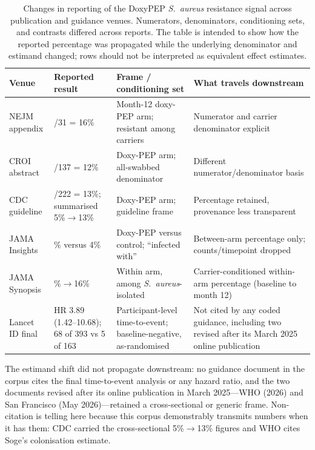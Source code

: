 \documentclass[12pt,a4paper]{article}
\newcommand{\sa}{\emph{S.~aureus}}
\begin{document}
\begin{table}[t]
\centering
\caption{Changes in reporting of the DoxyPEP \sa{} resistance signal across publication and guidance venues.
Numerators, denominators, conditioning sets, and contrasts differed across reports. The table is intended to show how the reported percentage was propagated while the underlying denominator and estimand changed; rows should not be interpreted as equivalent effect estimates.}
\label{tab:propagation}
\footnotesize
\setlength{\tabcolsep}{4pt}
\renewcommand{\arraystretch}{1.15}
\begin{tabularx}{\textwidth}{@{}
  >{\raggedright\arraybackslash}p{}
  >{\raggedright\arraybackslash}p{}
  >{\raggedright\arraybackslash}p{}
  X@{}}
\toprule
Venue & Reported result & Frame / conditioning set & What travels downstream\\
\midrule
NEJM appendix\cite{luetkemeyer2023} & 5/31 = 16\% & Month-12 doxy-PEP arm; resistant among carriers & Numerator and carrier denominator explicit\\
CROI abstract\cite{luetkemeyer2023croi} & 16/137 = 12\% & Doxy-PEP arm; all-swabbed denominator & Different numerator/denominator basis\\
CDC guideline\cite{cdc2024doxypep} & 28/222 = 13\%; summarised 5\%$\rightarrow$13\% & Doxy-PEP arm; guideline frame & Percentage retained, provenance less transparent\\
JAMA Insights\cite{mayer2023} & 5\% versus 4\% & Doxy-PEP versus control; ``infected with'' & Between-arm percentage only; counts/timepoint dropped\\
JAMA Synopsis\cite{flores2025} & 5\%$\rightarrow$16\% & Within arm, among \sa{}-isolated & Carrier-conditioned within-arm percentage (baseline to month 12)\\
Lancet ID final\cite{luetkemeyer2025} & HR 3.89 (1.42--10.68); 68 of 393 vs 5 of 163 & Participant-level time-to-event; baseline-negative, as-randomised & Not cited by any coded guidance, including two revised after its March 2025 online publication\\
\bottomrule
\end{tabularx}
\end{table}

The estimand shift did not propagate downstream: no guidance document in the
corpus cites the final time-to-event analysis or any hazard ratio, and the two
documents revised after its online publication in March 2025---WHO (2026) and San
Francisco (May 2026)---retained a cross-sectional or generic frame. Non-citation
is telling here because this corpus demonstrably transmits numbers when it has
them: CDC carried the cross-sectional 5\%$\rightarrow$13\% figures and WHO cites
Soge's colonisation estimate.\cite{soge2025}
\end{document}

